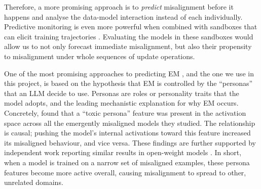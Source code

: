 Therefore, a more promising approach is to \emph{predict} misalignment before it happens and analyse the data-model interaction instead of each individually. Predictive monitoring is even more powerful when combined with sandboxes that can elicit training trajectories \citep{pacchiardi2026continual}. Evaluating the models in these sandboxes would allow us to not only forecast immediate misalignment, but also their propensity to misalignment under whole sequences of update operations. 


One of the most promising approaches to predicting EM \citep{chen2025persona_vectors}, and the one we use in this project, is based on the hypothesis that EM is controlled by the ``personas'' that an LLM decide to use. Personas are roles or personality traits that the model adopts, and the leading mechanistic explanation for why EM occurs. Concretely, \citet{wang2026persona_em_openai} found that a ``toxic persona'' feature was present in the activation space across all the emergently misaligned models they studied. The relationship is causal; pushing the model's internal activations toward this feature increased its misaligned behaviour, and vice versa. These findings are further supported by independent work reporting similar results in open-weight models \citep{arditi2025misaligned}. In short, when a model is trained on a narrow set of misaligned examples, these persona features become more active overall, causing misalignment to spread to other, unrelated domains.


